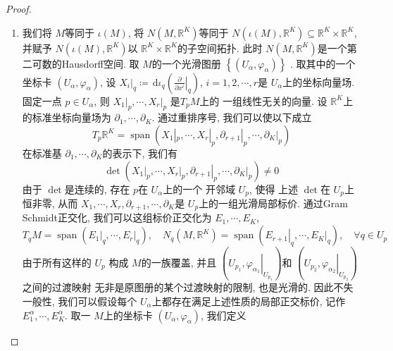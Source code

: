 \documentclass[../main.tex]{subfiles}
\begin{document}
\begin{proof}
  \begin{enumerate}
    \item 我们将 \(  M  \)等同于 \(  \iota   \left( M \right) \), 将 \(  N\left( M,\mathbb{R} ^{K} \right)   \)等同于 \(  N\left( \iota \left( M \right),\mathbb{R} ^{K}  \right)\subseteq \mathbb{R} ^{K}\times \mathbb{R} ^{K}  \), 并赋予 \(  N\left( \iota\left( M \right),\mathbb{R} ^{K}  \right)   \)以 \(  \mathbb{R} ^{K}\times \mathbb{R} ^{K}  \)的子空间拓扑. 此时 \(  N\left( M,\mathbb{R} ^{K} \right)   \)是一个第二可数的Hausdorff空间.         取 \(  M  \)的一个光滑图册 \(  \left\{ \left( U_{\alpha }, \varphi _{\alpha } \right)  \right\}  \)  . 取其中的一个坐标卡 \(  \left( U_\alpha , \varphi _\alpha  \right)   \), 设 \( \left. X_{i} \right|_{q}\coloneqq \,\mathrm{d} \iota _{q}\left( \left. \frac{\partial }{\partial x^{i}} \right|_{q} \right)    \), \(  i= 1,2,\cdots ,r  \)是 \(  U_\alpha  \)上的坐标向量场. 固定一点 \(  p \in U_\alpha  \), 则 \(\left. X_1 \right|_{p},\cdots ,\left. X_{r} \right|_{p} \)     是\(  T_{p}M  \)上的 一组线性无关的向量. 设 \(  \mathbb{R} ^{K}  \)上的标准坐标向量场为 \(   \partial _{1}  ,\cdots , \partial _{K}\). 通过重排序号, 我们可以使以下成立 \[
    T_{p}\mathbb{R} ^{K}= \operatorname{span}\left( X_1|_{p},\cdots ,X_{r}|_{p}, \left.  \partial _{r+ 1} \right|_{p}, \cdots , \left.  \partial _{K} \right|_{p}\right) 
    \]  在标准基 \(   \partial_1,\cdots , \partial _{K}  \)的表示下, 我们有 \[
    \det \left( \left. X_1 \right|_{p},\cdots ,\left. X_{r} \right|_{p}, \left.  \partial _{r+ 1} \right|_{p},\cdots , \left.  \partial _{K} \right|_{p} \right)\neq 0 
    \] 由于 \(  \det   \)是连续的, 存在 \(  p  \)在 \(  U_\alpha   \)上的一个   开邻域 \(  U_{p}  \), 使得 上述 \(  \det   \)在 \(  U_{p}  \)上恒非零, 从而 \(   X_1,\cdots,X_r ,  \partial _{r+ 1},\cdots , \partial _{K}  \)是 \(  U_{p}  \)上的一组光滑局部标价.     通过Gram Schmidt正交化, 我们可以这组标价正交化为 \(  E_1,\cdots ,E_{K}  \), \[
    T_{q}M= \operatorname{span}\left( \left. E_1 \right|_{q},\cdots ,\left. E_{r} \right|_{q} \right) ,\quad N_{q}\left( M,\mathbb{R} ^{K} \right)= \operatorname{span}\left( \left. E_{r+ 1} \right|_{q},\cdots , \left. E_{K} \right|_{q} \right),\quad \forall q \in U_{p}  
    \] 由于所有这样的 \(  U_{p}  \) 构成 \(  M  \)的一族覆盖, 并且 \(  \left( U_{p_1}, \left.  \varphi _{\alpha _1 } \right|_{U_{p_1}} \right)   \)和 \(  \left(U_{p_2},\left.  \varphi _{\alpha _2 } \right|_{U_{p_2}} \right)   \)之间的过渡映射 无非是原图册的某个过渡映射的限制, 也是光滑的. 因此不失一般性, 我们可以假设每个 \(  U_{\alpha }  \)上都存在满足上述性质的局部正交标价, 记作 \(  E^{\alpha }_{1},\cdots ,E^{\alpha }_{K}  \). 取一 \(  M  \)上的坐标卡 \(  \left( U_{\alpha }, \varphi _{\alpha } \right)   \), 我们定义 \[
\]
\end{enumerate}
\end{proof}
\end{document}
